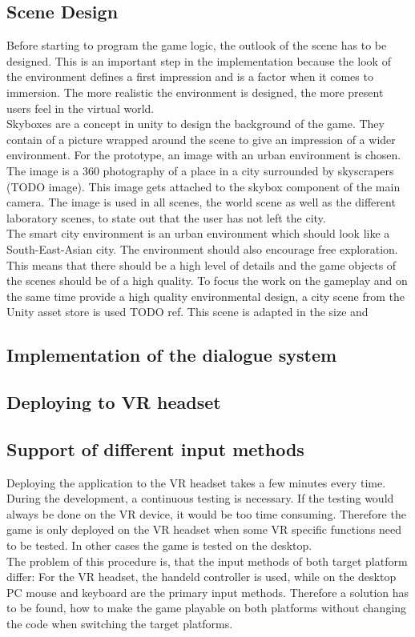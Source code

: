 \subsection{Scene Design}
Before starting to program the game logic, the outlook of the scene has to be designed. This is an important step in the implementation because the look of the environment defines a first impression and is a factor when it comes to immersion. The more realistic the environment is designed, the more present users feel in the virtual world.\\
Skyboxes are a concept in unity to design the background of the game. They contain of a picture wrapped around the scene to give an impression of a wider environment. 
For the prototype, an image with an urban environment is chosen. The image is a 360 photography of a place in a city surrounded by skyscrapers (TODO image). This image gets attached to the skybox component of the main camera. The image is used in all scenes, the world scene as well as the different laboratory scenes, to state out that the user has not left the city. \\
The smart city environment is an urban environment which should look like a South-East-Asian city. The environment should also encourage free exploration. This means that there should be a high level of details and the game objects of the scenes should be of a high quality. To focus the work on the gameplay and on the same time provide a high quality environmental design, a city scene from the Unity asset store is used TODO ref. This scene is adapted in the size and  
\subsection{Implementation of the dialogue system}

\subsection{Deploying to VR headset}
\subsection{Support of different input methods}
\label{inputmethods}
Deploying the application to the VR headset takes a few minutes every time. During the development, a continuous testing is necessary. If the testing would always be done on the VR device, it would be too time consuming. Therefore the game is only deployed on the VR headset when some VR specific functions need to be tested. In other cases the game is tested on the desktop. \\
The problem of this procedure is, that the input methods of both target platform differ: For the VR headset, the handeld controller is used, while on the desktop PC mouse and keyboard are the primary input methods. Therefore a solution has to be found, how to make the game playable on both platforms without changing the code when switching the target platforms.

